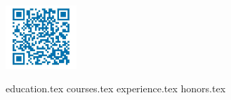 \documentclass[11pt, a4paper]{awesome-cv}
\newcommand*{\sectiondir}{resume/}
\begin{document}
\begin{flushright}
    \includegraphics[width=0.2\textwidth]{linkedIn_QR}
\end{flushright}
\makecvheader

{education.tex}
{courses.tex}
{experience.tex}
{honors.tex}
\end{document}
